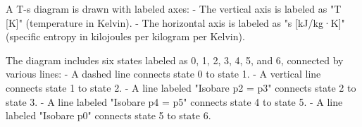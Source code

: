 A T-s diagram is drawn with labeled axes:  
- The vertical axis is labeled as "T [K]" (temperature in Kelvin).  
- The horizontal axis is labeled as "s [kJ/kg·K]" (specific entropy in kilojoules per kilogram per Kelvin).  

The diagram includes six states labeled as 0, 1, 2, 3, 4, 5, and 6, connected by various lines:  
- A dashed line connects state 0 to state 1.  
- A vertical line connects state 1 to state 2.  
- A line labeled "Isobare p2 = p3" connects state 2 to state 3.  
- A line labeled "Isobare p4 = p5" connects state 4 to state 5.  
- A line labeled "Isobare p0" connects state 5 to state 6.